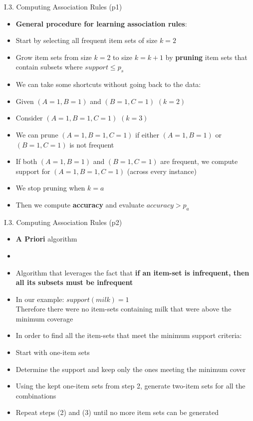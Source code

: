 \documentclass[handout]{beamer}
\newcommand{\strong}[1]{\textbf{\color{teal} #1}}
\newcommand{\stronger}[1]{\textbf{\color{purple} #1}}
\begin{document}
\begin{frame}{I.3. Computing Association Rules (p1)}
\begin{itemize}
\item[] \strong{General procedure for learning association rules}:
\item[1.] Start by selecting all frequent item sets of size $k=2$
\item[2.] Grow item sets from size $k=2$ to size $k=k+1$ by \strong{pruning} item sets that contain subsets where $support \le p_s$
\item[$\bullet$] We can take some shortcuts without going back to the data:\\
\item[--] Given $(A=1,B=1)$ and $(B=1,C=1)$ $(k=2)$
\item[--] Consider $(A=1,B=1,C=1)$ $(k=3)$
\item[$\rightarrow$] We can prune $(A=1,B=1,C=1)$ if either $(A=1,B=1)$ or $(B=1,C=1)$ is not frequent
\item[3.] If both $(A=1,B=1)$ and $(B=1,C=1)$ are frequent, we compute support for $(A=1,B=1,C=1)$ (across every instance)
\item[4.] We stop pruning when $k=a$
\item[5.] Then we compute \strong{accuracy} and evaluate $accuracy > p_a$
\end{itemize}
\end{frame}
\begin{frame}{I.3. Computing Association Rules (p2)}
\begin{itemize}
\item[] \stronger{A Priori} algorithm~\cite{agrawal-srikant-vldb:1994}
\item[]
\item Algorithm that leverages the fact that \textbf{if an item-set is infrequent, then all its subsets must be infrequent}
\item In our example: $support(milk) = 1$\\
Therefore there were no item-sets containing milk that were above the minimum coverage
\item In order to find all the item-sets that meet the minimum support criteria:
\item[(1)] Start with one-item sets
\item[(2)] Determine the support and keep only the ones meeting the minimum cover
\item[(3)] Using the kept one-item sets from step 2, generate two-item sets for all the combinations 
\item[(4)] Repeat steps (2) and (3) until no more item sets can be generated
\end{itemize}
\end{frame}
\end{document}
